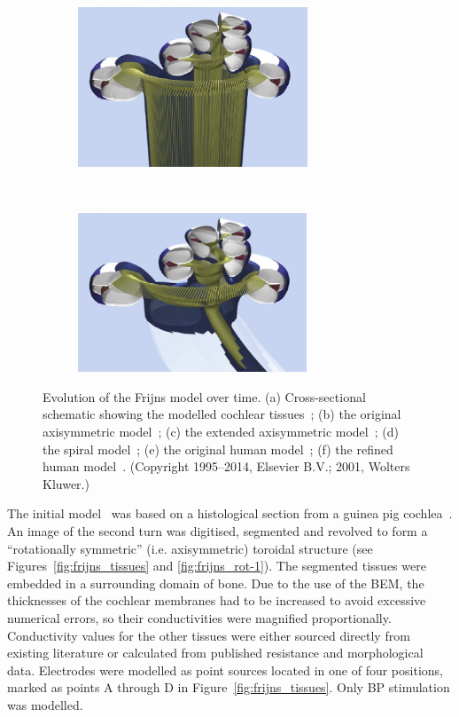 \begin{figure}
    \begin{subfigure}[t]{0.45\textwidth}
        \centering
        \includegraphics[height=4.75cm]{Background/frijns_human-1_surf}
        \caption{ }
        \label{fig:frijns_human-1}
    \end{subfigure}%
    ~~~~
    \begin{subfigure}[t]{0.45\textwidth}
        \centering
        \includegraphics[height=4.75cm]{Background/frijns_human-2_surf}
        \caption{ }
        \label{fig:frijns_human-2}
    \end{subfigure}%
    
    \caption[Evolution of the Frijns model]{Evolution of the Frijns model over
    time. (a) Cross-sectional schematic showing the modelled cochlear
    tissues~\cite{frijns2000}; (b) the original axisymmetric
    model~\cite{frijns1995}; (c) the extended axisymmetric
    model~\cite{briaire2000field}; (d) the spiral model~\cite{frijns2000}; (e)
    the original human model~\cite{frijns2001,kalkman2014}; (f) the refined
    human model~\cite{kalkman2014}. (Copyright \textcopyright{} 1995--2014,
    Elsevier B.V.; 2001, Wolters Kluwer.)}
	\label{fig:model_frijns_evolution}
\end{figure}

The initial model~\cite{frijns1995,frijns1996} was based on a histological
section from a guinea pig cochlea~\cite{frijns1995}. An image of the second turn
was digitised, segmented and revolved to form a ``rotationally symmetric'' (i.e.
axisymmetric) toroidal structure (see Figures~\ref{fig:frijns_tissues} and
\ref{fig:frijns_rot-1}). The segmented tissues were embedded in a surrounding
domain of bone. Due to the use of the BEM, the thicknesses of the cochlear
membranes had to be increased to avoid excessive numerical errors, so their
conductivities were magnified proportionally. Conductivity values for the other
tissues were either sourced directly from existing literature or calculated from
published resistance and morphological data. Electrodes were modelled as point
sources located in one of four positions, marked as points A through D in
Figure~\ref{fig:frijns_tissues}. Only BP stimulation was modelled.

